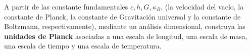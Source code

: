\documentclass[../main.tex]{subfiles}
\begin{document}
\begin{problema}[10]
	A partir de las constante fundamentales \(c, h, G, \kappa_{B}\),
	(la velocidad del vacío, la constante de Planck, la constante de Gravitación universal
	y la constante de Boltzmann, respectivamente),
	mediante un análisis dimensional, construya las
	\textbf{unidades de Planck} asociadas a una escala de longitud,
	una escala de masa, una escala de tiempo y una escala de temperatura.
\end{problema}
\end{document}
